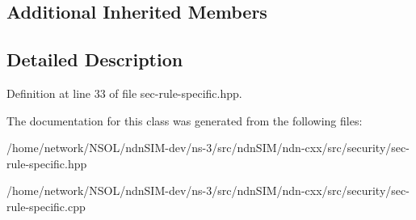 \subsection*{Additional Inherited Members}


\subsection{Detailed Description}


Definition at line 33 of file sec-\/rule-\/specific.\+hpp.



The documentation for this class was generated from the following files\+:\begin{DoxyCompactItemize}
\item 
/home/network/\+N\+S\+O\+L/ndn\+S\+I\+M-\/dev/ns-\/3/src/ndn\+S\+I\+M/ndn-\/cxx/src/security/sec-\/rule-\/specific.\+hpp\item 
/home/network/\+N\+S\+O\+L/ndn\+S\+I\+M-\/dev/ns-\/3/src/ndn\+S\+I\+M/ndn-\/cxx/src/security/sec-\/rule-\/specific.\+cpp\end{DoxyCompactItemize}
